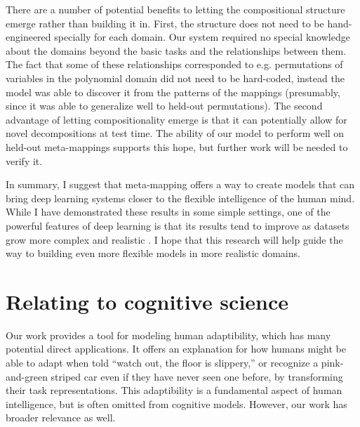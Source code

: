 There are a number of potential benefits to letting the compositional structure emerge rather than building it in. First, the structure does not need to be hand-engineered specially for each domain. Our system required no special knowledge about the domains beyond the basic tasks and the relationships between them. The fact that some of these relationships corresponded to e.g. permutations of variables in the polynomial domain did not need to be hard-coded, instead the model was able to discover it from the patterns of the mappings (presumably, since it was able to generalize well to held-out permutations). The second advantage of letting compositionality emerge is that it can potentially allow for novel decompositions at test time. The ability of our model to perform well on held-out meta-mappings supports this hope, but further work will be needed to verify it. \par

In summary, I suggest that meta-mapping offers a way to create models that can bring deep learning systems closer to the flexible intelligence of the human mind. While I have demonstrated these results in some simple settings, one of the powerful features of deep learning is that its results tend to improve as datasets grow more complex and realistic \citep{Hill2019a,Radford2019,Sutton2019}. I hope that this research will help guide the way to building even more flexible models in more realistic domains.  \par

\section{Relating to cognitive science}

Our work provides a tool for modeling human adaptibility, which has many potential direct applications. It offers an explanation for how humans might be able to adapt when told ``watch out, the floor is slippery,'' or recognize a pink-and-green striped car even if they have never seen one before, by transforming their task representations. This adaptibility is a fundamental aspect of human intelligence, but is often omitted from cognitive models. However, our work has broader relevance as well. \par 

